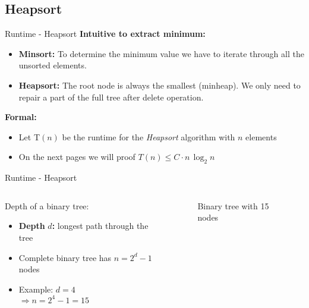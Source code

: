 \subsection{Heapsort}

\begin{frame}{Runtime - Heapsort}
  \textbf{Intuitive to extract minimum:}
  \begin{itemize}
    \item<1- |handout:1>
      \textbf{Minsort:}
      To determine the minimum value we have to iterate through all the
      unsorted elements.
    \item<2- |handout:1>
      \textbf{Heapsort:}
      The root node is always the smallest (minheap).
      We only need to repair a part of the full tree after delete
      operation.
  \end{itemize}
  \textbf{Formal:}
  \begin{itemize}
    \item<4- |handout:1>
      Let {\color{MainA}T$(n)$} be the runtime for the \textit{Heapsort}
      algorithm with {\color{MainA}$n$} elements
    \item<5- |handout:1>
      On the next pages we will proof
      {\color{MainA}$T(n) \leq C \cdot n \, \log_2 n$}
  \end{itemize}
\end{frame}


\begin{frame}{Runtime - Heapsort}
  \begin{columns}
    \begin{column}{0.5\textwidth}
      Depth of a binary tree:
      \begin{itemize}
        \item
          \textbf{Depth} {\color{MainA}$d$}\textbf{:}
          longest path through the tree
        \item
          Complete binary tree has {\color{MainA}$n = 2^d - 1$} nodes
        \item
          Example: {\color{MainA}$d = 4$}\\
          {\color{MainA}$\Rightarrow n = 2^4 - 1 = 15$}
      \end{itemize}
    \end{column}
    \begin{column}{0.5\textwidth}
      \begin{figure}
        \begin{adjustbox}{width=\linewidth}
        \end{adjustbox}
        \caption{Binary tree with 15 nodes}%
        \label{fig:binary_tree}%
      \end{figure}
    \end{column}
  \end{columns}
\end{frame}
